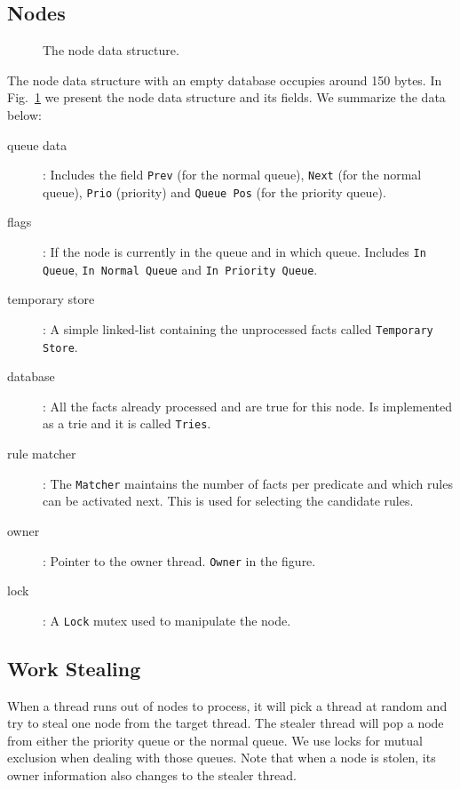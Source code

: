 \subsection{Nodes}

\begin{figure}[h!]
     \centering
    \caption{The node data structure.}
    \label{fig:node}
\end{figure}

The node data structure with an empty database occupies around 150 bytes.
In Fig.~\ref{fig:node} we present the node data structure and its fields. We summarize the data below:

\begin{description}
   \item[queue data]: Includes the field \texttt{Prev} (for the normal queue), \texttt{Next} (for the normal queue), \texttt{Prio} (priority) and \texttt{Queue Pos} (for the priority queue).
   \item[flags]: If the node is currently in the queue and in which queue. Includes \texttt{In Queue}, \texttt{In Normal Queue} and \texttt{In Priority Queue}.
   \item[temporary store]: A simple linked-list containing the unprocessed facts called \texttt{Temporary Store}.
   \item[database]: All the facts already processed and are true for this node. Is implemented as a trie and it is called \texttt{Tries}.
   \item[rule matcher]: The \texttt{Matcher} maintains the number of facts per predicate and which rules can be activated next. This is used for selecting the candidate rules.
   \item[owner]: Pointer to the owner thread. \texttt{Owner} in the figure.
   \item[lock]: A \texttt{Lock} mutex used to manipulate the node.
\end{description}

\subsection{Work Stealing}

When a thread runs out of nodes to process, it will pick a thread at random and try to steal one node
from the target thread. The stealer thread will pop a node from either the priority queue or the normal queue. We use locks for mutual exclusion when dealing with those queues. Note that when a
node is stolen, its owner information also changes to the stealer thread.

